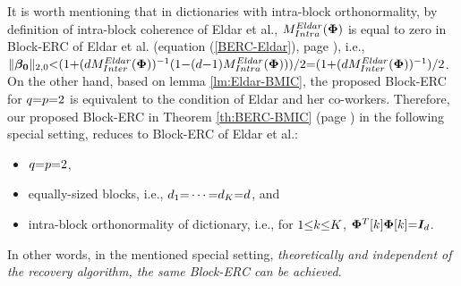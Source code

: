 \begin{remark}
\label{Rmrk:Eldar-BMIC-equality}
It is worth mentioning that in dictionaries with intra-block orthonormality, by definition of intra-block coherence of Eldar et al., $M^{Eldar}_{Intra}(\boldsymbol{\Phi})$ is equal to zero in Block-ERC of Eldar et al. (equation (\ref{BERC-Eldar}), page \pageref{BERC-Eldar}), i.e., $\Vert \boldsymbol{\beta_0} \Vert_{2,0} {<} (1 {+} (d M^{Eldar}_{Inter}(\boldsymbol{\Phi}))^{-1} (1 {-} (d {-} 1)M^{Eldar}_{Intra}(\boldsymbol{\Phi})))/2 {=} (1 {+} (d M^{Eldar}_{Inter}(\boldsymbol{\Phi}))^{-1})/2$.
On the other hand, based on lemma \ref{lm:Eldar-BMIC}, the proposed Block-ERC for $q {=} p {=} 2$ is equivalent to the condition of Eldar and her co-workers.
Therefore, our proposed Block-ERC in Theorem \ref{th:BERC-BMIC} (page \pageref{th:BERC-BMIC}) in the following special setting, reduces to Block-ERC of Eldar et al.: 
\begin{itemize}
\item $q {=} p {=} 2$,
\item equally-sized blocks, i.e., $d_1 {=} \cdots {=} d_K {=} d$, and
\item intra-block orthonormality of dictionary, i.e., for $1 {\leq} k {\leq} K$, $\boldsymbol{\Phi}^T[k] \boldsymbol{\Phi}[k] {=} \boldsymbol{I}_d$.
\end{itemize}
In other words, in the mentioned special setting, \emph{theoretically and independent of the recovery algorithm, the same Block-ERC can be achieved}.
\end{remark}
